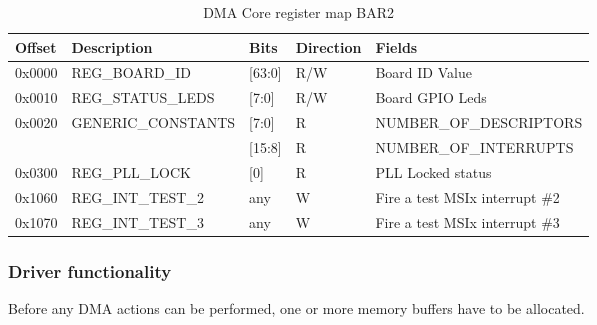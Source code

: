 \begin{table}[H]
	\centering
	\begin{tabularx}{\textwidth}{|l|X|l|l|l|}
	\hline
	\textbf{Offset} & \textbf{Description} &\textbf{Bits}&\textbf{Direction}& \textbf{Fields}\\
	\hline
	0x0000  & REG\_BOARD\_ID & [63:0] & R/W & Board ID Value\\
	\hline
	0x0010  & REG\_STATUS\_LEDS & [7:0] & R/W & Board GPIO Leds\\
	\hline
	0x0020  & GENERIC\_CONSTANTS& [7:0] & R & NUMBER\_OF\_DESCRIPTORS\\
	        & &[15:8] & R & NUMBER\_OF\_INTERRUPTS \\
	\hline
	0x0300  & REG\_PLL\_LOCK & [0] & R & PLL Locked status\\
	\hline
	0x1060  & REG\_INT\_TEST\_2 & any & W & Fire a test MSIx interrupt \#2 \\
	\hline
	0x1070  & REG\_INT\_TEST\_3 & any & W & Fire a test MSIx interrupt \#3 \\
	\hline

	\end{tabularx}
	\caption{DMA Core register map BAR2}\label{tab:dma_register_map_bar2}
\end{table}
\newpage
\subsubsection{Driver functionality}
Before any DMA actions can be performed, one or more memory buffers have to be allocated. 

